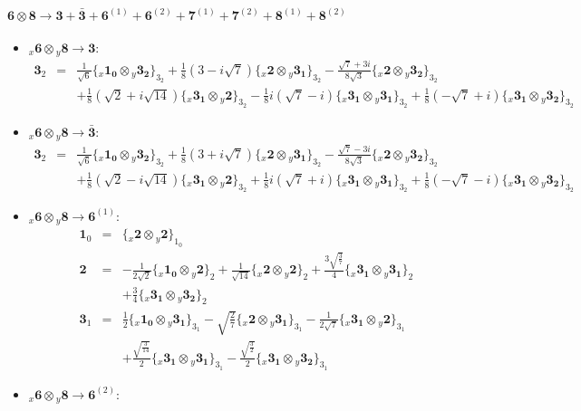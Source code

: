 \documentclass[english]{article}
\newcommand{\rep}[1]{\mathbf{#1}}
\newcommand{\repx}[2]{{}_{#2}\mathbf{#1}}
\newcommand{\subcg}[3]{\big\{ \repx{#1}{x}\otimes\repx{#2}{y}\big\}^{}_{#3}}
\begin{document}
\paragraph*{\Large $\rep{6}\otimes\rep{8}\to\rep{3}+\rep{\bar{3}}+\rep{6}^{(1)}+\rep{6}^{(2)}+\rep{7}^{(1)}+\rep{7}^{(2)}+\rep{8}^{(1)}+\rep{8}^{(2)}$}
\begin{itemize}
\item $\repx{6}{x}\otimes\repx{8}{y}\to\rep{3}$:
\begin{eqnarray*}
\rep{3}_{2} &=& \frac{1}{\sqrt{6}}\subcg{1_{0}}{3_{2}}{3_{2}}+\frac{1}{8} \left(3-i \sqrt{7}\right)\subcg{2}{3_{1}}{3_{2}}-\frac{\sqrt{7}+3 i}{8 \sqrt{3}}\subcg{2}{3_{2}}{3_{2}} \\ 
 & & +\frac{1}{8} \left(\sqrt{2}+i \sqrt{14}\right)\subcg{3_{1}}{2}{3_{2}}-\frac{1}{8} i \left(\sqrt{7}-i\right)\subcg{3_{1}}{3_{1}}{3_{2}}+\frac{1}{8} \left(-\sqrt{7}+i\right)\subcg{3_{1}}{3_{2}}{3_{2}}
\end{eqnarray*}
\item $\repx{6}{x}\otimes\repx{8}{y}\to\rep{\bar{3}}$:
\begin{eqnarray*}
\rep{3}_{2} &=& \frac{1}{\sqrt{6}}\subcg{1_{0}}{3_{2}}{3_{2}}+\frac{1}{8} \left(3+i \sqrt{7}\right)\subcg{2}{3_{1}}{3_{2}}-\frac{\sqrt{7}-3 i}{8 \sqrt{3}}\subcg{2}{3_{2}}{3_{2}} \\ 
 & & +\frac{1}{8} \left(\sqrt{2}-i \sqrt{14}\right)\subcg{3_{1}}{2}{3_{2}}+\frac{1}{8} i \left(\sqrt{7}+i\right)\subcg{3_{1}}{3_{1}}{3_{2}}+\frac{1}{8} \left(-\sqrt{7}-i\right)\subcg{3_{1}}{3_{2}}{3_{2}}
\end{eqnarray*}
\item $\repx{6}{x}\otimes\repx{8}{y}\to\rep{6}^{(1)}$:
\begin{eqnarray*}
\rep{1}_{0} &=& \subcg{2}{2}{1_{0}}
\\
\rep{2} &=& -\frac{1}{2 \sqrt{2}}\subcg{1_{0}}{2}{2}+\frac{1}{\sqrt{14}}\subcg{2}{2}{2}+\frac{3 \sqrt{\frac{3}{7}}}{4}\subcg{3_{1}}{3_{1}}{2} \\ 
 & & +\frac{3}{4}\subcg{3_{1}}{3_{2}}{2}
\\
\rep{3}_{1} &=& \frac{1}{2}\subcg{1_{0}}{3_{1}}{3_{1}}-\sqrt{\frac{2}{7}}\subcg{2}{3_{1}}{3_{1}}-\frac{1}{2 \sqrt{7}}\subcg{3_{1}}{2}{3_{1}} \\ 
 & & +\frac{\sqrt{\frac{3}{14}}}{2}\subcg{3_{1}}{3_{1}}{3_{1}}-\frac{\sqrt{\frac{3}{2}}}{2}\subcg{3_{1}}{3_{2}}{3_{1}}
\end{eqnarray*}
\item $\repx{6}{x}\otimes\repx{8}{y}\to\rep{6}^{(2)}$:
\begin{eqnarray*}

\end{eqnarray*}
\end{itemize}
\end{document}

